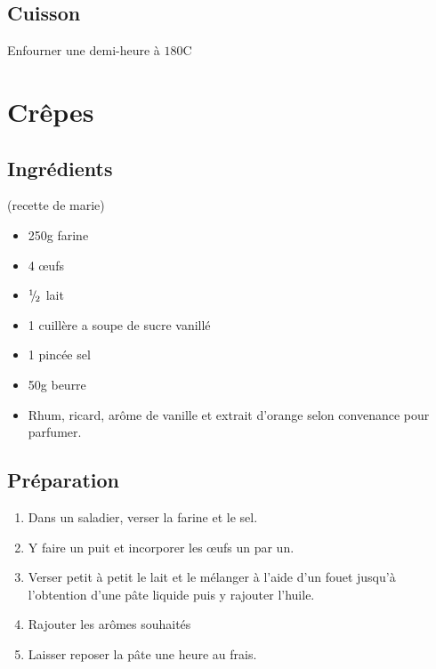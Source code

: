 \subsection*{Cuisson}
Enfourner une demi-heure à $180$\degres C

\newpage
\section{Crêpes}
\subsection*{Ingrédients}

(recette de marie)

\begin{itemize}
\item 250g farine
\item 4 œufs
\item ${{}^{1\!\!}/ _{\!2}}$ lait
\item 1 cuillère a soupe de sucre vanillé
\item 1 pincée sel
\item 50g beurre
\item Rhum, ricard, arôme de vanille et extrait d'orange selon convenance pour parfumer.
\end{itemize}


\subsection*{Préparation}
\begin{enumerate}
\item Dans un saladier, verser la farine et le sel.
\item Y faire un puit et incorporer les œufs un par un.
\item Verser petit à petit le lait et le mélanger à l'aide d'un fouet jusqu'à l'obtention d'une pâte liquide puis y rajouter l'huile.
\item Rajouter les arômes souhaités
\item Laisser reposer la pâte une heure au frais.
\end{enumerate}

